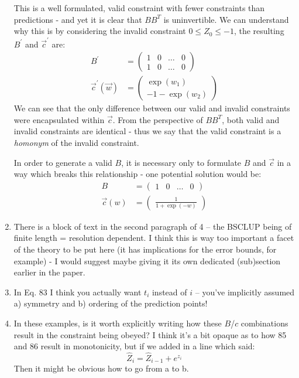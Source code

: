 \documentclass[]{article}
\begin{document}
\begin{enumerate}
		This is a well formulated, valid constraint with fewer constraints than predictions - and yet it is clear that $BB^T$ is uninvertible. We can understand why this is by considering the invalid constraint $0 \leq Z_0 \leq -1$, the resulting $B^\prime$ and $\vec{c}^\prime$ are:
		\begin{align}
				B^\prime &= \begin{pmatrix}
					1 & 0 & \hdots & 0
					\\
					1 & 0 & \hdots & 0
				\end{pmatrix}
				\\
				\vec{c}^\prime(\vec{w})& = \begin{pmatrix}
					\exp(w_1)
					\\
					-1 - \exp(w_2)
				\end{pmatrix}
		\end{align}
		We can see that the only difference between our valid and invalid constraints were encapsulated within $\vec{c}$. From the perspective of $BB^T$, both valid and invalid constraints are identical - thus we say that the valid constraint is a \textit{homonym} of the invalid constraint. 

		In order to generate a valid $B$, it is necessary only to formulate $B$ and $\vec{c}$ in a way which breaks this relationship - one potential solution would be:
		\begin{align}
			B & = \begin{pmatrix}
				1 & 0 & \hdots & 0
			\end{pmatrix}
			\\
			\vec{c}(w) & = \begin{pmatrix}
				\frac{1}{1 + \exp(-w)}
			\end{pmatrix}
		\end{align}

		\item There is a block of text in the second paragraph of 4 -- the BSCLUP being of finite length = resolution dependent. I think this is way too important a facet of the theory to be put here (it has implications for the error bounds, for example) - I would suggest maybe giving it its own dedicated (sub)section earlier in the paper.
		\item In Eq. 83 I think you actually want $t_i$ instead of $i$ -- you've implicitly assumed a) symmetry and b) ordering of the prediction points!
		\item In these examples, is it worth explicitly writing how these $B$/$c$ combinations result in the constraint being obeyed? I think it's a bit opaque as to how 85 and 86 result in monotonicity, but if we added in a line which said:
		\begin{equation}
			\hat{Z}_i = \hat{Z}_{i-1} + e^{z_i}
		\end{equation}
		Then it might be obvious how to go from a to b.

		\end{enumerate}
\end{document}
